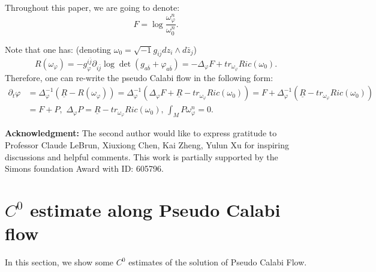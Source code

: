 \documentclass[11pt]{amsart}
\numberwithin{equation}{section}
\begin{document}
Throughout this paper,  we are going to denote:
\begin{equation*}
F=\log\frac{\omega_{\varphi}^n}{\omega_0^n}.
\end{equation*}


Note that one has: (denoting $\omega_0=\sqrt{-1}g_{i\bar{j}}dz_i\wedge d\bar{z}_j$)
\begin{equation*}
R(\omega_{\varphi})=-g_{\varphi}^{i\bar{j}}\partial_{i\bar{j}}\log\det(g_{a\bar{b}}+\varphi_{a\bar{b}})=-\Delta_{\varphi}F+tr_{\omega_{\varphi}}Ric(\omega_0).
\end{equation*}
Therefore,  one can re-write the pseudo Calabi flow in the following form:
\begin{equation*}
\begin{split}
\partial_t\varphi&=\Delta_{\varphi}^{-1}(\underline{R}-R(\omega_{\varphi}))=\Delta_{\varphi}^{-1}(\Delta_{\varphi}F+\underline{R}-tr_{\omega_{\varphi}}Ric(\omega_0))=F+\Delta_{\varphi}^{-1}(\underline{R}-tr_{\omega_{\varphi}}Ric(\omega_0))\\
&=F+P,\,\,\Delta_{\varphi}P=\underline{R}-tr_{\omega_{\varphi}}Ric(\omega_0),\,\int_MP\omega_{\varphi}^n=0.
\end{split}
\end{equation*}


\textbf{Acknowledgment:} The second author would like to express gratitude to Professor Claude LeBrun, Xiuxiong Chen,  Kai Zheng, Yulun Xu for inspiring discussions and helpful comments.  This work is partially supported by the Simons foundation Award with ID: 605796.




\section{$C^0$ estimate along Pseudo Calabi flow}

In this section, we show some $C^0$ estimates of the solution of Pseudo Calabi Flow. \\ 

\begin{center}
 \\[6mm]
\end{center}
\end{document}
